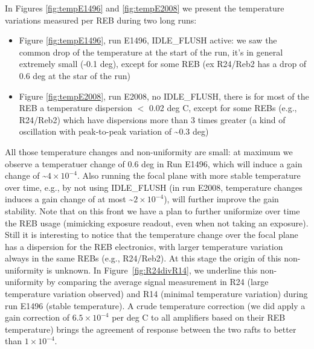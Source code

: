 In Figures \ref{fig:tempE1496} and \ref{fig:tempE2008} we present the temperature variations measured per REB during two long runs:  

\begin{itemize}
\item Figure \ref{fig:tempE1496}, run E1496, IDLE\_FLUSH active: we saw the common drop of the temperature at the start of the run, it’s in general extremely small (-0.1 deg), except for some REB (ex R24/Reb2 has a drop of 0.6 deg at the star of the run) 
\item Figure \ref{fig:tempE2008}, run E2008, no IDLE\_FLUSH, there is for most of the REB a temperature dispersion $<$ 0.02 deg C, except for some REBs (e.g., R24/Reb2) which have dispersions more than 3 times greater (a kind of oscillation with peak-to-peak variation of \textasciitilde 0.3 deg) 
\end{itemize}

All those temperature changes and non-uniformity are small: at maximum we observe a temperatuer change of 0.6 deg in Run E1496, which will induce a gain change of \textasciitilde $4\times 10^{-4}$. Also running the focal plane with more stable temperature over time, e.g., by not using IDLE\_FLUSH (in run E2008, temperature changes induces a gain change of at most \textasciitilde$2\times 10^{-4}$), will further improve the gain stability. Note that on this front we have a plan to further uniformize over time the REB usage (mimicking exposure readout, even when not taking an exposure). Still it is interesting to notice that the temperature change over the focal plane has a dispersion for the REB electronics, with larger temperature variation always in the same REBs (e.g., R24/Reb2). At this stage the origin of this  non-uniformity is unknown. 
In Figure~\ref{fig:R24divR14}, we underline this non-uniformity by comparing the average signal measurement in R24 (large temperature variation observed) and R14 (minimal temperature variation) during run E1496 (stable temperature). A crude temperature correction (we did apply a gain correction of $6.5\times10^{-4}$ per deg C to all amplifiers based on their REB temperature)  brings the agreement of response  between the two rafts to better than $1\times10^{-4}$.  


\clearpage
